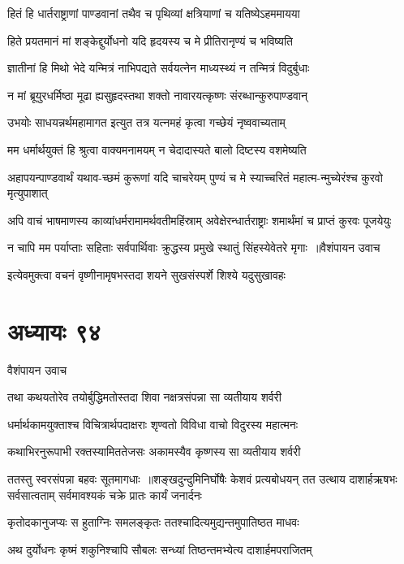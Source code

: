 \twolineshloka
{हितं हि धार्तराष्ट्राणां पाण्डवानां तथैव च}
{पृथिव्यां क्षत्रियाणां च यतिष्येऽहममायया}


\twolineshloka
{हिते प्रयतमानं मां शङ्केद्दुर्योधनो यदि}
{हृदयस्य च मे प्रीतिरानृण्यं च भविष्यति}


\twolineshloka
{ज्ञातीनां हि मिथो भेदे यन्मित्रं नाभिपद्यते}
{सर्वयत्नेन माध्यस्थ्यं न तन्मित्रं विदुर्बुधाः}


\twolineshloka
{न मां ब्रूयुरधर्मिष्ठा मूढा ह्यसुहृदस्तथा}
{शक्तो नावारयत्कृष्णः संरब्धान्कुरुपाण्डवान्}


\twolineshloka
{उभयोः साधयन्नर्थमहामागत इत्युत}
{तत्र यत्नमहं कृत्वा गच्छेयं नृष्ववाच्यताम्}


\twolineshloka
{मम धर्मार्थयुक्तं हि श्रुत्वा वाक्यमनामयम्}
{न चेदादास्यते बालो दिष्टस्य वशमेष्यति}


\twolineshloka
{अहापयन्पाण्डवार्थं यथाव-च्छमं कुरूणां यदि चाचरेयम्}
{पुण्यं च मे स्याच्चरितं महात्म-न्मुच्येरंश्च कुरवो मृत्युपाशात्}


\twolineshloka
{अपि वाचं भाषमाणस्य काव्यांधर्मरामामर्थवतीमहिंस्राम्}
{अवेक्षेरन्धार्तराष्ट्राः शमार्थंमां च प्राप्तं कुरवः पूजयेयुः}


\threelineshloka
{न चापि मम पर्याप्ताः सहिताः सर्वपार्थिवाः}
{क्रुद्धस्य प्रमुखे स्थातुं सिंहस्येवेतरे मृगाः ॥वैशंपायन उवाच}
{}


\twolineshloka
{इत्येवमुक्त्वा वचनं वृष्णीनामृषभस्तदा}
{शयने सुखसंस्पर्शे शिश्ये यदुसुखावहः}


\chapter{अध्यायः ९४}
\twolineshloka
{वैशंपायन उवाच}
{}


\twolineshloka
{तथा कथयतोरेव तयोर्बुद्धिमतोस्तदा}
{शिवा नक्षत्रसंपन्ना सा व्यतीयाय शर्वरी}


\twolineshloka
{धर्मार्थकामयुक्ताश्च विचित्रार्थपदाक्षराः}
{शृण्वतो विविधा वाचो विदुरस्य महात्मनः}


\twolineshloka
{कथाभिरनुरूपाभी रक्तस्यामिततेजसः}
{अकामस्यैव कृष्णस्य सा व्यतीयाय शर्वरी}


ततस्तु स्वरसंपन्ना बहवः सूतमागधाः ॥शङ्खदुन्दुमिनिर्घोषैः केशवं प्रत्यबोधयन्
\twolineshloka
{तत उत्थाय दाशार्हऋषभः सर्वसात्वताम्}
{सर्वमावश्यकं चक्रे प्रातः कार्यं जनार्दनः}


\twolineshloka
{कृतोदकानुजप्यः स हुताग्निः समलङ्कृतः}
{ततश्चादित्यमुद्यन्तमुपातिष्ठत माधवः}


\twolineshloka
{अथ दुर्योधनः कृष्मं शकुनिश्चापि सौबलः}
{सन्ध्यां तिष्ठन्तमभ्येत्य दाशार्हमपराजितम्}


